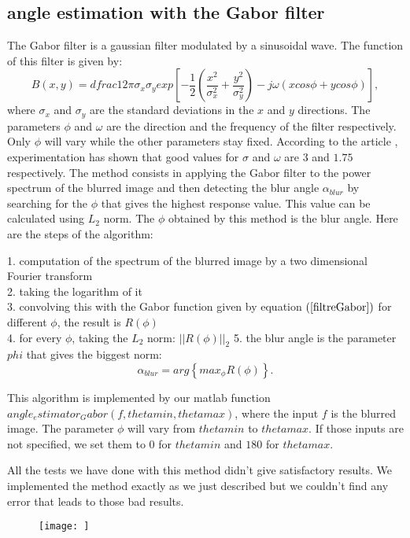 \subsection{angle estimation with the Gabor filter}

The Gabor filter is a gaussian filter modulated by a sinusoidal wave. The function of this filter is given by:
\begin{equation}
B(x,y)=dfrac{1}{2\pi \sigma_x \sigma_y} exp\left[-\frac{1}{2}\left(\frac{x^2}{\sigma_x^2}+ \frac{y^2}{\sigma_y^2} \right) -j\omega(xcos\phi + ycos\phi)\right],
\label{filtreGabor}
\end{equation}
where $\sigma_x$ and $\sigma_y$ are the standard deviations in the $x$ and $y$ directions. The parameters $\phi$ and $\omega$ are the direction and the frequency of the filter respectively. Only $\phi$ will vary while the other parameters stay fixed. According to the article \cite{dash2014motion}, experimentation has shown that good values for $\sigma$ and $\omega$ are $3$ and $1.75$ respectively. The method consists in applying the Gabor filter to the power spectrum of the blurred image and then detecting the blur angle $\alpha_{blur}$ by searching for the $\phi$ that gives the highest response value. This value can be calculated using $L_2$ norm. The $\phi$ obtained by this method is the blur angle. Here are the steps of the algorithm:

1. computation of the spectrum of the blurred image by a two dimensional Fourier transform\\
2. taking the logarithm of it\\
3. convolving this with the Gabor function given by equation $(\ref{filtreGabor})$ for different $\phi$, the result is $R(\phi)$\\
4. for every $\phi$, taking the $L_2$ norm: $||R(\phi)||_2$
5. the blur angle is the parameter $phi$ that gives the biggest norm:
\begin{equation}
\alpha_{blur} = arg \left\lbrace max_{\phi}R(\phi)\right\rbrace.
\end{equation}

This algorithm is implemented by our matlab function $angle_estimator_Gabor(f,thetamin, thetamax)$, where the input $f$ is the blurred image. The parameter $\phi$ will vary from $thetamin$ to $thetamax$. If those inputs are not specified, we set them to $0$ for $thetamin$ and $180$ for $thetamax$.

All the tests we have done with this method didn't give satisfactory results. We implemented the method exactly as we just described but we couldn't find any error that leads to those bad results. 


\begin{figure}
\centering
\texttt{[image: ]}
\end{figure}


